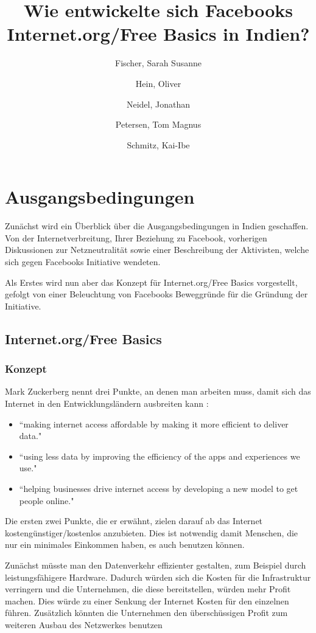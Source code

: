 \documentclass{article}
\title{Wie entwickelte sich Facebooks Internet.org/Free Basics in Indien?}
\author{
  Fischer, Sarah Susanne\\
  \and
  Hein, Oliver\\
  \and
  Neidel, Jonathan\\
  \and
  Petersen, Tom Magnus\\
  \and
  Schmitz, Kai-Ibe\\
}
\begin{document}
\maketitle

\section{Ausgangsbedingungen}

Zunächst wird ein Überblick über die Ausgangsbedingungen in Indien geschaffen. Von der Internetverbreitung, Ihrer Beziehung zu Facebook, vorherigen Diskussionen zur Netzneutralität sowie einer Beschreibung der Aktivisten, welche sich gegen Facebooks Initiative wendeten.

Als Erstes wird nun aber das Konzept für Internet.org/Free Basics vorgestellt, gefolgt von einer Beleuchtung von Facebooks Beweggründe für die Gründung der Initiative.

\subsection{Internet.org/Free Basics}

\subsubsection{Konzept}
        
Mark Zuckerberg nennt drei Punkte, an denen man arbeiten muss, damit sich das Internet in den Entwicklungsländern ausbreiten kann
\parencite{HumanRight}:
\begin{itemize}
\item ``making internet access affordable by making it more efficient to deliver data."

\item ``using less data by improving the efficiency of the apps and experiences we use."

\item ``helping businesses drive internet access by developing a new model to get people online."  
\end{itemize}

Die ersten zwei Punkte, die er erwähnt, zielen darauf ab das Internet kostengünstiger/kostenlos anzubieten. 
Dies ist notwendig damit Menschen, die nur ein minimales Einkommen haben, es auch benutzen können.
\medskip

Zunächst müsste man den Datenverkehr effizienter gestalten, zum Beispiel durch leistungsfähigere Hardware.
Dadurch würden sich die Kosten für die Infrastruktur verringern und die Unternehmen, die diese bereitstellen, würden mehr Profit    
machen. Dies würde zu einer Senkung der Internet Kosten für den einzelnen führen.
Zusätzlich könnten die Unternehmen den überschüssigen Profit zum weiteren Ausbau des Netzwerkes benutzen\\
\end{document}

